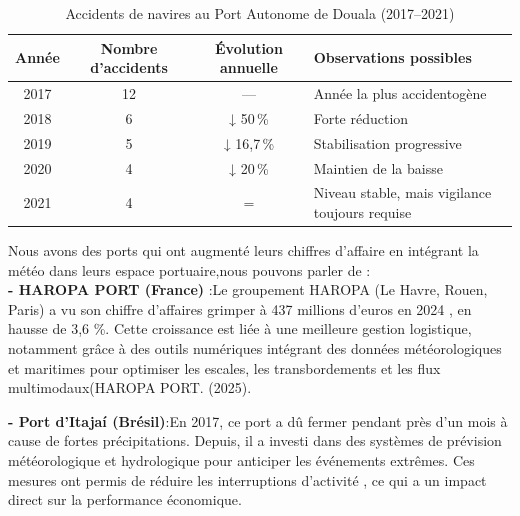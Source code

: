 \documentclass[a4paper,12pt,openany]{report}
\begin{document}
\begin{table}[htbp]
	\centering
	\caption{Accidents de navires au Port Autonome de Douala (2017–2021)}
	\begin{tabular}{|c|c|c|p{7cm}|}
		\hline
		\textbf{Année} & \textbf{Nombre d'accidents} & \textbf{Évolution annuelle} & \textbf{Observations possibles} \\
		\hline
		2017 & 12 & --- & Année la plus accidentogène \\
		\hline
		2018 & 6 & ↓ 50\,\% & Forte réduction \\
		\hline
		2019 & 5 & ↓ 16{,}7\,\% & Stabilisation progressive \\
		\hline
		2020 & 4 & ↓ 20\,\% & Maintien de la baisse \\
		\hline
		2021 & 4 & = & Niveau stable, mais vigilance toujours requise \\
		\hline
	\end{tabular}
	\label{tab:douala_accidents}
\end{table}

\quad 
Nous avons des ports qui ont augmenté leurs chiffres d'affaire en intégrant la météo dans leurs espace portuaire,nous pouvons parler de :\\
\quad
\textbf{- HAROPA PORT (France) }:Le groupement HAROPA (Le Havre, Rouen, Paris) a vu son chiffre d’affaires grimper à  437 millions d’euros en 2024 , en hausse de 3,6 \%. Cette croissance est liée à une meilleure gestion logistique, notamment grâce à des outils numériques intégrant des données météorologiques et maritimes pour optimiser les escales, les transbordements et les flux multimodaux(HAROPA PORT. (2025)\cite{GPFMA2024}.

\quad
\textbf{- Port d’Itajaí (Brésil)}:En 2017, ce port a dû fermer pendant près d’un mois à cause de fortes précipitations. Depuis, il a investi dans des systèmes de prévision météorologique et hydrologique pour anticiper les événements extrêmes. Ces mesures ont permis de  réduire les interruptions d’activité , ce qui a un impact direct sur la performance économique\cite{Murara2018}.
\end{document}
